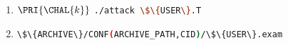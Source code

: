

\begin{enumerate}
\item \DESCTASKIMPL
      {$\PRI{\CHAL{k}}$}
      {\mbox{\lstinline[language={bash}]|./attack \$\{USER\}.T|}}
\item \DESCTASKEXAM
      {\mbox{\lstinline[language={bash}]|\$\{ARCHIVE\}/CONF(ARCHIVE_PATH,CID)/\$\{USER\}.exam|}}
\end{enumerate}

